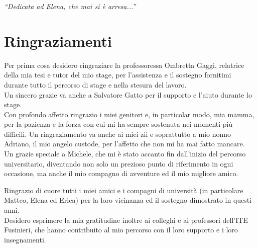 \cleardoublepage
{}
{}

\begin{flushright}{
    \slshape
    ``Dedicata ad Elena, che mai si è arresa...''} \\
\end{flushright}

\begingroup
\let\clearpage\relax
\let\cleardoublepage\relax

\chapter*{Ringraziamenti}
\noindent\begin{small}Per prima cosa desidero ringraziare la professoressa Ombretta Gaggi, relatrice della mia tesi e tutor del mio stage, per l’assistenza e il sostegno fornitimi durante tutto il percorso di stage e nella stesura del lavoro.\\
Un sincero grazie va anche a Salvatore Gatto per il supporto e l’aiuto durante lo stage.\\

\noindent Con profondo affetto ringrazio i miei genitori e, in particolar modo, mia mamma, per la pazienza e la forza con cui mi ha sempre sostenuta nei momenti più difficili. Un ringraziamento va anche ai miei zii e soprattutto a mio nonno Adriano, il mio angelo custode, per l’affetto che non mi ha mai fatto mancare.\\

\noindent Un grazie speciale a Michele, che mi è stato accanto fin dall’inizio del percorso universitario, diventando non solo un prezioso punto di riferimento in ogni occasione, ma anche il mio compagno di avventure ed il mio migliore amico.

\noindent Ringrazio di cuore tutti i miei amici e i compagni di università (in particolare Matteo, Elena ed Erica) per la loro vicinanza ed il sostegno dimostrato in questi anni.\\

\noindent Desidero esprimere la mia gratitudine inoltre ai colleghi e ai professori dell’ITE Fusinieri, che hanno contribuito al mio percorso con il loro supporto e i loro insegnamenti.\\
\end{small}
\vspace{0.75cm}

\noindent{\myLocation, \myTime}
\hfill \textit{\myName}

\endgroup